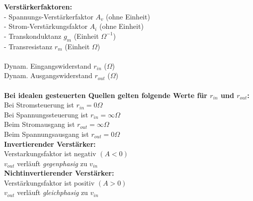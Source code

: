 			\begin{minipage}{8cm}
            {\bf Verstärkerfaktoren:}\\
            - Spannungs-Verstärkerfaktor \hspace{4mm}$A_v$ (ohne Einheit)\\
            - Strom-Verstärkungsfaktor \hspace{6mm} $A_i$ (ohne Einheit)\\
            - Transkonduktanz \hspace{19mm} $g_m$ (Einheit $\Omega^{-1}$)\\
            - Transresistanz \hspace{24mm} $r_m$ (Einheit $\Omega$)\\ \\
            Dynam. Eingangswiderstand \hspace{5mm} $r_{in}$ ($\Omega$)\\
            Dynam. Ausgangswiderstand \hspace{4mm} $r_{out}$ ($\Omega$)\\ \\
            {\bf Bei idealen gesteuerten Quellen gelten folgende Werte für
            $r_{in}$ und $r_{out}$:}\\
            Bei Stromsteuerung ist \hspace{13.5mm} $r_{in}=0 \Omega$\\
            Bei Spannungssteuerung ist \hspace{6.5mm} $r_{in}=\infty \Omega$\\
            Beim Stromausgang ist \hspace{13.5mm} $r_{out}=\infty \Omega$\\
            Beim Spannungsausgang ist \hspace{6.5mm} $r_{out}=0 \Omega$\\
            
            {\bf Invertierender Verstärker:}\\
            Verstarkungsfaktor ist negativ $(A<0)$\\
            $v_{out}$ verläuft {\it gegenphasig} zu $v_{in}$\\
            
            {\bf Nichtinvertierender Verstärker:}\\
            Verstärkungsfaktor ist positiv $(A>0)$\\
            $v_{out}$ verläuft {\it gleichphasig} zu $v_{in}$
            \end{minipage}
	
